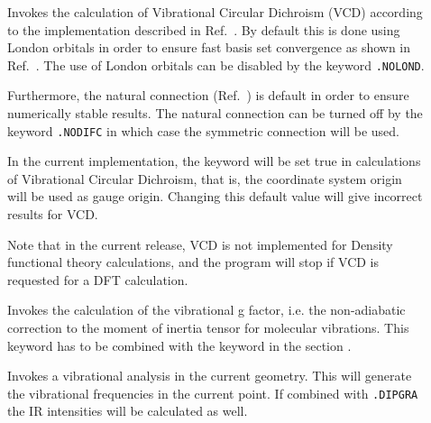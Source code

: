 \begin{description}
\item[] Invokes the calculation of Vibrational Circular
Dichroism (VCD)
according to the implementation described in
Ref.~\cite{klbpjthkrhjajjcp98}.  By default this is done using London
orbitals in order to
ensure fast basis set convergence as shown in
Ref.~\cite{klbpjthkrhjajjcp100}. The use of London
orbitals can be disabled by the keyword \verb|.NOLOND|.

Furthermore, the natural connection
(Ref.~\cite{joklbkrthpjtca90,krthjopjklbcpl235}) is default in order to ensure
numerically stable results. The natural
connection can be turned off by the keyword \verb|.NODIFC| in which
case the symmetric connection will be used.


In the current implementation, the keyword  will be set
true in calculations of Vibrational Circular Dichroism, that is, the
coordinate system origin will be used as gauge origin. Changing this
default value will give incorrect results for VCD.

Note that in the current release, VCD is not implemented for Density
functional theory calculations, and the program will stop if VCD is
requested for a DFT calculation.


\item[] Invokes the calculation of the vibrational g factor,
i.e. the non-adiabatic correction to the moment of inertia tensor for
molecular vibrations.
This keyword has to be combined with the keyword  in the section .

\item[] Invokes a vibrational analysis in the current
geometry. This will generate the vibrational frequencies in the
current point. If combined with \verb|.DIPGRA| the IR intensities
will be calculated as well.


\end{description}

